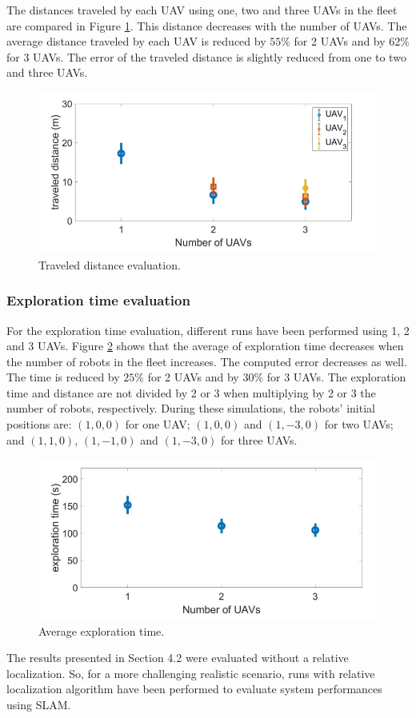 \documentclass[11pt,openany]{book}
\begin{document}
The distances traveled by each UAV using one, two and three UAVs in the ﬂeet are compared in Figure \ref{fig:3.21}. This distance decreases with the number of UAVs. The average distance traveled by each UAV is reduced by $55\%$ for 2 UAVs and by $62\%$ for 3 UAVs. The error of the traveled distance is slightly reduced from one to two and three UAVs.
\begin{figure}[H]
    \centering
    \includegraphics[scale=0.4]{assets/3_21.png}
    \caption{Traveled distance evaluation.}
    \label{fig:3.21}
\end{figure}
\subsubsection{Exploration time evaluation}
For the exploration time evaluation, diﬀerent runs have been performed using 1, 2 and 3 UAVs. Figure \ref{fig:3.22} shows that the average of exploration time decreases when the number of robots in the ﬂeet increases. The computed error decreases as well. The time is reduced by $25\%$ for 2 UAVs and by $30\%$ for 3 UAVs. The exploration time and distance are not divided by 2 or 3 when multiplying by 2 or 3 the number of robots, respectively. During these simulations, the robots’ initial positions are: $(1,0,0)$ for one UAV; $(1,0,0)$ and $(1,-3,0)$ for two UAVs; and $(1,1,0)$, $(1,-1,0)$ and $(1,-3,0)$ for three UAVs.
\begin{figure}[H]
    \centering
    \includegraphics[scale=0.4]{assets/3_22.png}
    \caption{Average exploration time.}
    \label{fig:3.22}
\end{figure}
The results presented in Section 4.2 were evaluated without a relative localization. So, for a more challenging realistic scenario, runs with relative localization algorithm have been performed to evaluate system performances using SLAM.
\end{document}
